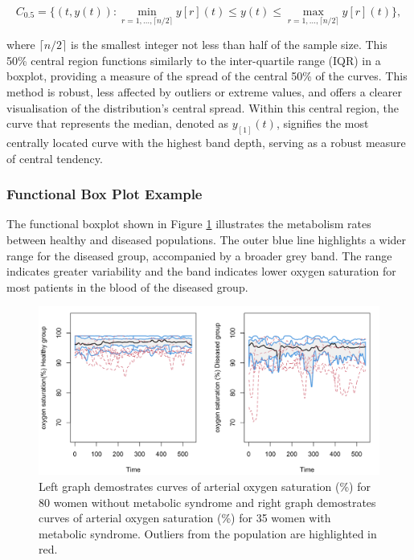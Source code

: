 \documentclass{article}\usepackage[]{graphicx}\usepackage[]{xcolor}
\numberwithin{equation}{section}
\begin{document}
\begin{equation}
C_{0.5} = \{(t, y(t)) : \min_{r=1, \ldots, \lceil n/2 \rceil} y[r](t) \leq y(t) \leq \max_{r=1, \ldots, \lceil n/2 \rceil} y[r](t)\},
\end{equation}

\noindent
where $\lceil n/2 \rceil$ is the smallest integer not less than half of the sample size. This 50\% central region functions similarly to the inter-quartile range (IQR) in a boxplot, providing a measure of the spread of the central 50\% of the curves. This method is robust, less affected by outliers or extreme values, and offers a clearer visualisation of the distribution's central spread. Within this central region, the curve that represents the median, denoted as $y_{[1]}(t)$, signifies the most centrally located curve with the highest band depth, serving as a robust measure of central tendency.

\subsubsection{Functional Box Plot Example}
\noindent
The functional boxplot shown in Figure \ref{fig:fbplot} illustrates the metabolism rates between healthy and diseased populations. The outer blue line highlights a wider range for the diseased group, accompanied by a broader grey band. The range indicates greater variability and the band indicates lower oxygen saturation for most patients in the blood of the diseased group.
\begin{figure}[H]
    \centering
    \includegraphics[width=1\textwidth]{image_reference/fbplot.png}
    \caption{Left graph demostrates curves of arterial oxygen saturation (\%) for 80 women without metabolic syndrome and right graph demostrates curves of arterial oxygen saturation (\%) for 35 women with metabolic syndrome. Outliers from the population are highlighted in red.}
    \label{fig:fbplot}
\end{figure}
\end{document}
